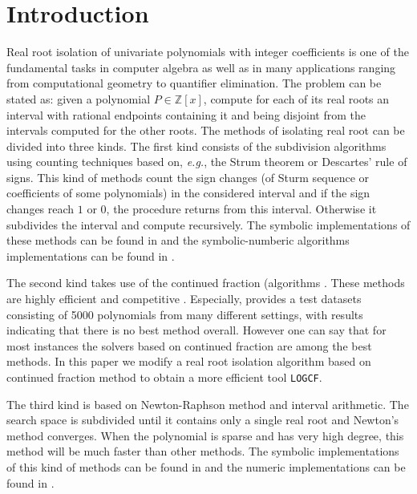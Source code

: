 \documentclass[10pt,a4paper]{article}
\def \froot {{\tt LOGCF}}
\def \ZZ {{\mathbb Z}}
\begin{document}
\maketitle
\section{Introduction }
\label{}
Real root isolation of univariate polynomials with integer coefficients is one of the fundamental tasks in computer algebra as well as in many applications ranging from computational geometry to quantifier elimination. The problem can be stated as: given a polynomial $P\in \ZZ[x]$, compute for each of its real roots an interval with rational endpoints containing it and being disjoint from the intervals
computed for the other roots.  The methods of isolating real root can be divided into three kinds.  The first kind consists of the subdivision algorithms using counting techniques based  on, {\it e.g.}, the Strum theorem or
Descartes' rule of signs.  This kind of methods count the sign changes (of Sturm sequence or coefficients of some polynomials) in the considered interval and if the sign changes reach $1$ or $0$, the procedure returns from this interval.
Otherwise it subdivides the interval and compute recursively. The symbolic implementations of these methods can be found in \cite{collin76,rou04} and the symbolic-numberic algorithms implementations can be found in \cite{rou04,eig05,eig08,meh11}. 

The second kind takes use of the continued fraction (algorithms \cite{akr08,tsi08,sha08}. These methods are highly efficient and competitive \cite{rou04,akr05,hemmer09}. Especially,  \cite{hemmer09} provides a test datasets   consisting of 5000 polynomials from many
different settings,  with results indicating that there is no best method overall. However one can say that for most instances the solvers based on  continued fraction are among
the best methods. In this paper we modify a real root isolation algorithm based on  continued fraction method to obtain a more efficient tool \froot.

The third kind is based on Newton-Raphson method and interval arithmetic.
The search space is subdivided until it contains only a single real root and Newton's method converges. When the polynomial is sparse and has very high degree, this method will be much faster than other methods. The symbolic implementations of this kind of methods can be found in \cite{xia06,xia07} and the numeric implementations
can be found in \cite{kla93,rump99}.
\end{document}

